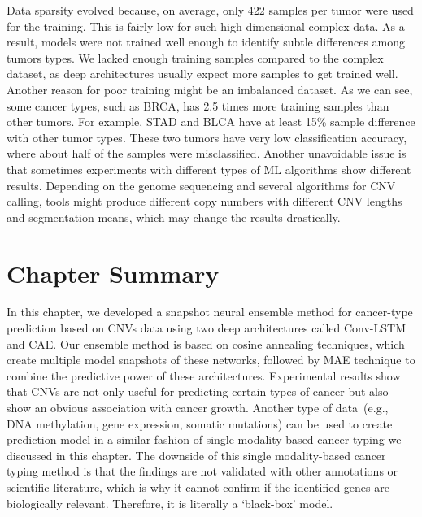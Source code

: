 \hspace*{3.5mm} Data sparsity evolved because, on average, only 422 samples per tumor were used for the training. This is fairly low for such high-dimensional complex data. As a result, models were not trained well enough to identify subtle differences among tumors types. We lacked enough training samples compared to the complex dataset, as deep architectures usually expect more samples to get trained well. %
Another reason for poor training might be an imbalanced dataset. As we can see, some cancer types, such as BRCA, has 2.5 times more training samples than other tumors. For example, STAD and BLCA have at least 15\% sample difference with other tumor types. These two tumors have very low classification accuracy, where about half of the samples were misclassified. Another unavoidable issue is that sometimes experiments with different types of ML algorithms show different results. Depending on the genome sequencing and several algorithms for CNV calling,  tools might produce different copy numbers with different CNV lengths and segmentation means, which may change the results drastically.

\section{Chapter Summary} \label{chapter_3:conclusion}
In this chapter, we developed a snapshot neural ensemble method for cancer-type prediction based on CNVs data using two deep architectures called Conv-LSTM and CAE. Our ensemble method is based on cosine annealing techniques, which create multiple model snapshots of these networks, followed by MAE technique to combine the predictive power of these architectures. Experimental results show that CNVs are not only useful for predicting certain types of cancer but also show an obvious association with cancer growth. Another type of data~(e.g., DNA methylation, gene expression, somatic mutations) can be used to create prediction model in a similar fashion of single modality-based cancer typing we discussed in this chapter. The downside of this single modality-based cancer typing method is that the findings are not validated with other annotations or scientific literature, which is why it cannot confirm if the identified genes are biologically relevant. Therefore, it is literally a `black-box' model. 

